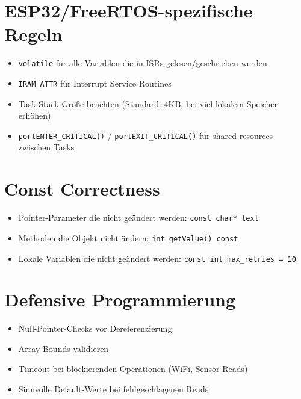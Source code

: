 \documentclass[a4paper,11pt]{article}
\begin{document}
\section{ESP32/FreeRTOS-spezifische Regeln}

\begin{itemize}[leftmargin=2em]
    \item \texttt{volatile} für alle Variablen die in ISRs gelesen/geschrieben werden
    \item \texttt{IRAM\_ATTR} für Interrupt Service Routines
    \item Task-Stack-Größe beachten (Standard: 4KB, bei viel lokalem Speicher erhöhen)
    \item \texttt{portENTER\_CRITICAL()} / \texttt{portEXIT\_CRITICAL()} für shared resources zwischen Tasks
\end{itemize}

\section{Const Correctness}

\begin{itemize}[leftmargin=2em]
    \item Pointer-Parameter die nicht geändert werden: \texttt{const char* text}
    \item Methoden die Objekt nicht ändern: \texttt{int getValue() const}
    \item Lokale Variablen die nicht geändert werden: \texttt{const int max\_retries = 10}
\end{itemize}

\section{Defensive Programmierung}

\begin{itemize}[leftmargin=2em]
    \item Null-Pointer-Checks vor Dereferenzierung
    \item Array-Bounds validieren
    \item Timeout bei blockierenden Operationen (WiFi, Sensor-Reads)
    \item Sinnvolle Default-Werte bei fehlgeschlagenen Reads
\end{itemize}
\end{document}
